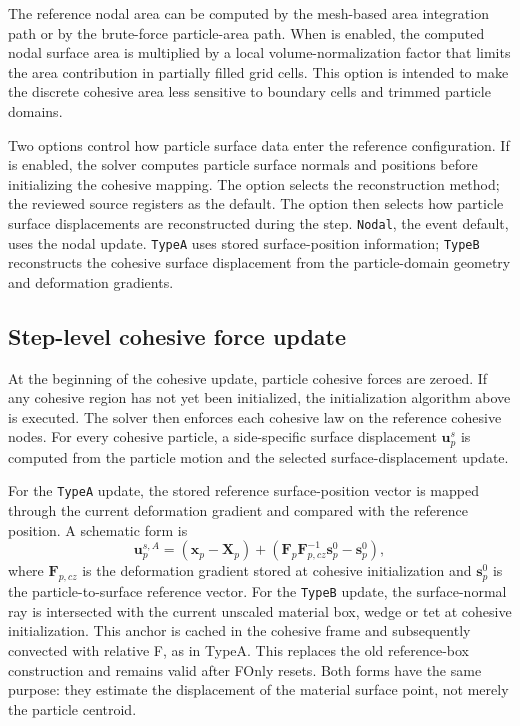 The reference nodal area can be computed by the mesh-based area integration path or by the brute-force particle-area path.  When  is enabled, the computed nodal surface area is multiplied by a local volume-normalization factor that limits the area contribution in partially filled grid cells.  This option is intended to make the discrete cohesive area less sensitive to boundary cells and trimmed particle domains.

Two options control how particle surface data enter the reference configuration.  If  is enabled, the solver computes particle surface normals and positions before initializing the cohesive mapping.  The  option selects the reconstruction method; the reviewed source registers  as the default.  The  option then selects how particle surface displacements are reconstructed during the step.  \texttt{Nodal}, the event default, uses the nodal update. \texttt{TypeA} uses stored surface-position information; \texttt{TypeB} reconstructs the cohesive surface displacement from the particle-domain geometry and deformation gradients.

\subsection{Step-level cohesive force update}

At the beginning of the cohesive update, particle cohesive forces are zeroed.  If any cohesive region has not yet been initialized, the initialization algorithm above is executed.  The solver then enforces each cohesive law on the reference cohesive nodes.  For every cohesive particle, a side-specific surface displacement $\mathbf{u}^s_p$ is computed from the particle motion and the selected surface-displacement update.

For the \texttt{TypeA} update, the stored reference surface-position vector is mapped through the current deformation gradient and compared with the reference position.  A schematic form is
\begin{equation}
  \mathbf{u}^{s,A}_p
  = (\mathbf{x}_p-\mathbf{X}_p)
    + \left(\mathbf{F}_p \mathbf{F}^{-1}_{p,cz}\mathbf{s}^0_p-\mathbf{s}^0_p\right),
  \label{eq:cz-typea-displacement}
\end{equation}
where $\mathbf{F}_{p,cz}$ is the deformation gradient stored at cohesive initialization and $\mathbf{s}^0_p$ is the particle-to-surface reference vector.  For the \texttt{TypeB} update, the surface-normal ray is intersected with the current unscaled material box, wedge or tet at cohesive initialization. This anchor is cached in the cohesive frame and subsequently convected with relative F, as in TypeA. This replaces the old reference-box construction and remains valid after FOnly resets.  Both forms have the same purpose: they estimate the displacement of the material surface point, not merely the particle centroid.

